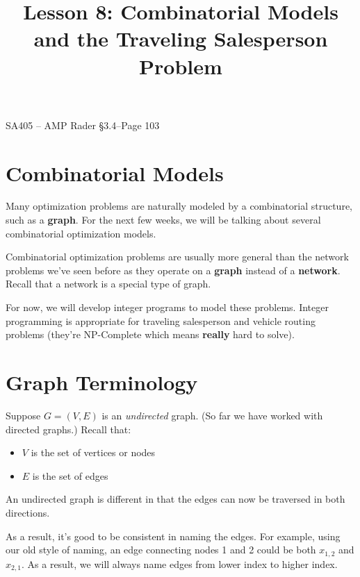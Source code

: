 \documentclass[11pt]{article}
\makeatletter
\theoremstyle{definition}
\newcommand{\answerbox}[3]{%
  \fbox{%
    \begin{minipage}[#1]{#2}
      \hfill\vspace{#3}
    \end{minipage}
  }
}
\newcommand{\answerboxfull}[2]{%
  \answerbox{#1}{6.38in}{#2} 
}
\renewcommand{\maketitle}{
  \noindent SA405 -- AMP \hfill Rader \S 3.4--Page 103 \\

  \begin{center}\Large{\textbf{\@title}}\end{center}
}
\makeatother
\begin{document}
  
\title{Lesson 8:  Combinatorial Models and the Traveling Salesperson Problem}

\maketitle

\section{Combinatorial Models}

Many optimization problems are naturally modeled by a combinatorial structure, such as a \textbf{graph}. For the next few weeks, we will be talking about several combinatorial optimization models.

Combinatorial optimization problems are usually more general than the network problems we've seen before as they operate on a \textbf{graph} instead of a \textbf{network}. Recall that a network is a special type of graph.

For now, we will develop integer programs to model these problems. Integer programming is appropriate for traveling salesperson and vehicle routing problems (they're NP-Complete which means \textbf{really} hard to solve).
%
%
%
%


\section{Graph Terminology}


Suppose $G = (V,E)$ is an \emph{undirected} graph. (So far we have worked with directed graphs.) Recall that:
	\begin{itemize}
	\item $V$ is the set of vertices or nodes
	\item $E$ is the set of edges
	\end{itemize}

An undirected graph is different in that the edges can now be traversed in both directions. \vspace{1in}

As a result, it's good to be consistent in naming the edges. For example, using our old style of naming, an edge connecting nodes 1 and 2 could be both $x_{1,2}$ and $x_{2,1}$. As a result, we will always name edges from lower index to higher index.
\end{document}

